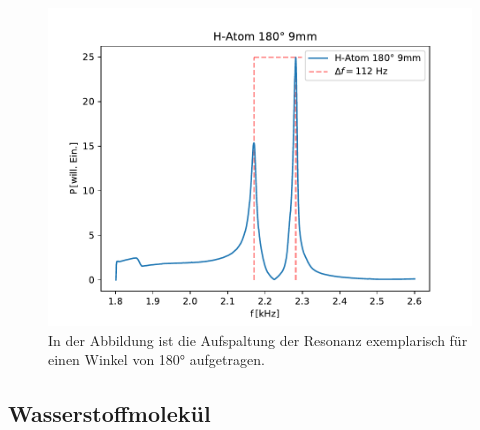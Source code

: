             \begin{figure}[ht]
                \centering
                \includegraphics[scale=0.5]{./pictures/hatom_180_9mm.pdf}
                \caption{In der Abbildung ist die Aufspaltung der Resonanz exemplarisch für einen Winkel von 180° aufgetragen.}
                \label{fig:hatom_180_9mm}
            \end{figure}
    \newpage
    \subsection{Wasserstoffmolekül}
